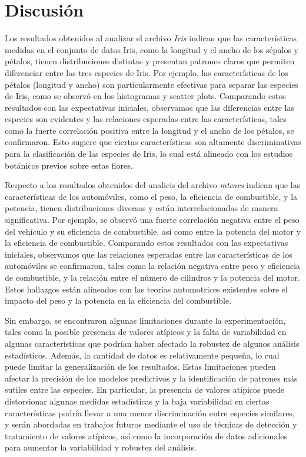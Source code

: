 \documentclass[conference]{IEEEtran}
\begin{document}
\section{Discusi\'on}
    Los resultados obtenidos al analizar el archivo \textit{Iris} indican que las características medidas en el conjunto de datos Iris, como la longitud y el ancho de los sépalos y pétalos, tienen distribuciones distintas y presentan patrones claros que permiten diferenciar entre las tres especies de Iris. Por ejemplo, las características de los pétalos (longitud y ancho) son particularmente efectivas para separar las especies de Iris, como se observó en los histogramas y scatter plots. Comparando estos resultados con las expectativas iniciales, observamos que las diferencias entre las especies son evidentes y las relaciones esperadas entre las características, tales como la fuerte correlación positiva entre la longitud y el ancho de los pétalos, se confirmaron. Esto sugiere que ciertas características son altamente discriminativas para la clasificación de las especies de Iris, lo cual está alineado con los estudios botánicos previos sobre estas flores.
    
    Respecto a los resultados obtenidos del analicis del archivo \textit{mtcars} indican que las características de los automóviles, como el peso, la eficiencia de combustible, y la potencia, tienen distribuciones diversas y están interrelacionadas de manera significativa. Por ejemplo, se observó una fuerte correlación negativa entre el peso del vehículo y su eficiencia de combustible, así como entre la potencia del motor y la eficiencia de combustible. Comparando estos resultados con las expectativas iniciales, observamos que las relaciones esperadas entre las características de los automóviles se confirmaron, tales como la relación negativa entre peso y eficiencia de combustible, y la relación entre el número de cilindros y la potencia del motor. Estos hallazgos están alineados con las teorías automotrices existentes sobre el impacto del peso y la potencia en la eficiencia del combustible.

    Sin embargo, se encontraron algunas limitaciones durante la experimentación, tales como la posible presencia de valores atípicos y la falta de variabilidad en algunas características que podrían haber afectado la robustez de algunos análisis estadísticos. Además, la cantidad de datos es relativamente pequeña, lo cual puede limitar la generalización de los resultados. Estas limitaciones pueden afectar la precisión de los modelos predictivos y la identificación de patrones más sutiles entre las especies. En particular, la presencia de valores atípicos puede distorsionar algunas medidas estadísticas y la baja variabilidad en ciertas características podría llevar a una menor discriminación entre especies similares, y serán abordadas en trabajos futuros mediante el uso de técnicas de detección y tratamiento de valores atípicos, así como la incorporación de datos adicionales para aumentar la variabilidad y robustez del análisis.
\end{document}
